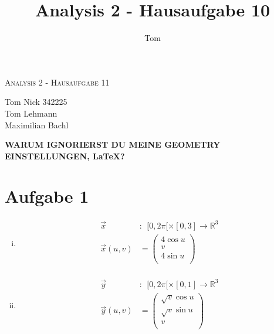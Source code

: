 \documentclass[10pt,a4paper,parskip=half]{scrartcl}
\author{Tom}
\title{Analysis 2 - Hausaufgabe 10}
\newcommand{\vecthree}[3]{\begin{pmatrix}#1\\#2\\#3\\\end {pmatrix}}
\begin{document}
\begin{center}
\textsc{\Large{Analysis 2 - Hausaufgabe 11}} \\
\end{center}
\begin{tabbing}
Tom Nick \hspace{1.4cm}\= 342225\\
Tom Lehmann\\
Maximilian Bachl
\end{tabbing}
\textbf{WARUM IGNORIERST DU MEINE GEOMETRY EINSTELLUNGEN, \LaTeX?}
\section*{Aufgabe 1}
\begin{enumerate}[(i)]
\item
\begin{align*}
\vec x&:~~ [0,2\pi[ \times [0,3] \to \mathbb{R}^3\\
\vec x(u,v) &= \vecthree{4\cos u}{v}{4\sin u} \\
\end{align*}
\item
\begin{align*}
\vec y&:~~ [0,2\pi[ \times [0,1] \to \mathbb{R}^3\\
\vec y(u,v) &= \vecthree{\sqrt v\cos u}{\sqrt v\sin u}{v} \\
\end{align*}
\end{enumerate}
\end{document}
